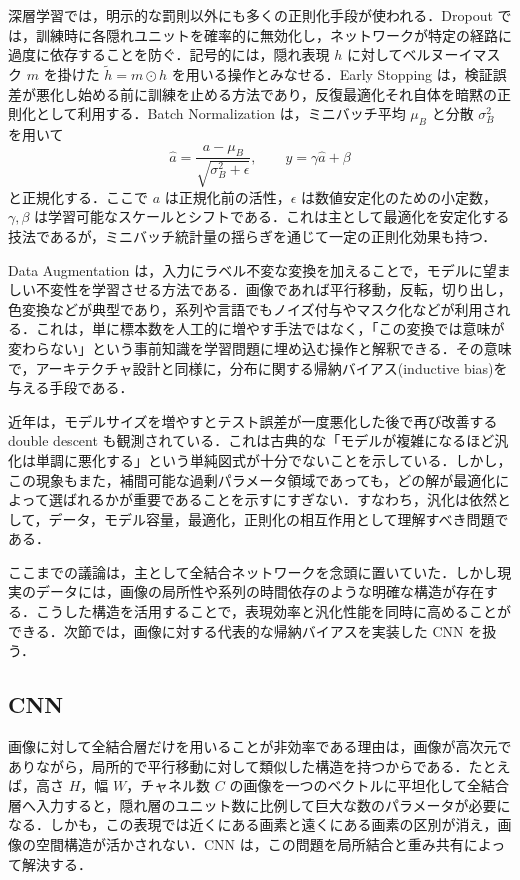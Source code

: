深層学習では，明示的な罰則以外にも多くの正則化手段が使われる．Dropout では，訓練時に各隠れユニットを確率的に無効化し，ネットワークが特定の経路に過度に依存することを防ぐ．記号的には，隠れ表現 $h$ に対してベルヌーイマスク $m$ を掛けた $\tilde h = m\odot h$ を用いる操作とみなせる．Early Stopping は，検証誤差が悪化し始める前に訓練を止める方法であり，反復最適化それ自体を暗黙の正則化として利用する．Batch Normalization は，ミニバッチ平均 $\mu_B$ と分散 $\sigma_B^2$ を用いて
\[
\hat a = \frac{a-\mu_B}{\sqrt{\sigma_B^2+\epsilon}},
\qquad
y = \gamma \hat a + \beta
\]
と正規化する．ここで $a$ は正規化前の活性，$\epsilon$ は数値安定化のための小定数，$\gamma,\beta$ は学習可能なスケールとシフトである．これは主として最適化を安定化する技法であるが，ミニバッチ統計量の揺らぎを通じて一定の正則化効果も持つ．

Data Augmentation は，入力にラベル不変な変換を加えることで，モデルに望ましい不変性を学習させる方法である．画像であれば平行移動，反転，切り出し，色変換などが典型であり，系列や言語でもノイズ付与やマスク化などが利用される．これは，単に標本数を人工的に増やす手法ではなく，「この変換では意味が変わらない」という事前知識を学習問題に埋め込む操作と解釈できる．その意味で，アーキテクチャ設計と同様に，分布に関する帰納バイアス(inductive bias)を与える手段である．

近年は，モデルサイズを増やすとテスト誤差が一度悪化した後で再び改善する double descent も観測されている．これは古典的な「モデルが複雑になるほど汎化は単調に悪化する」という単純図式が十分でないことを示している．しかし，この現象もまた，補間可能な過剰パラメータ領域であっても，どの解が最適化によって選ばれるかが重要であることを示すにすぎない．すなわち，汎化は依然として，データ，モデル容量，最適化，正則化の相互作用として理解すべき問題である．

ここまでの議論は，主として全結合ネットワークを念頭に置いていた．しかし現実のデータには，画像の局所性や系列の時間依存のような明確な構造が存在する．こうした構造を活用することで，表現効率と汎化性能を同時に高めることができる．次節では，画像に対する代表的な帰納バイアスを実装した CNN を扱う．

\subsection{CNN}
画像に対して全結合層だけを用いることが非効率である理由は，画像が高次元でありながら，局所的で平行移動に対して類似した構造を持つからである．たとえば，高さ $H$，幅 $W$，チャネル数 $C$ の画像を一つのベクトルに平坦化して全結合層へ入力すると，隠れ層のユニット数に比例して巨大な数のパラメータが必要になる．しかも，この表現では近くにある画素と遠くにある画素の区別が消え，画像の空間構造が活かされない．CNN は，この問題を局所結合と重み共有によって解決する．

